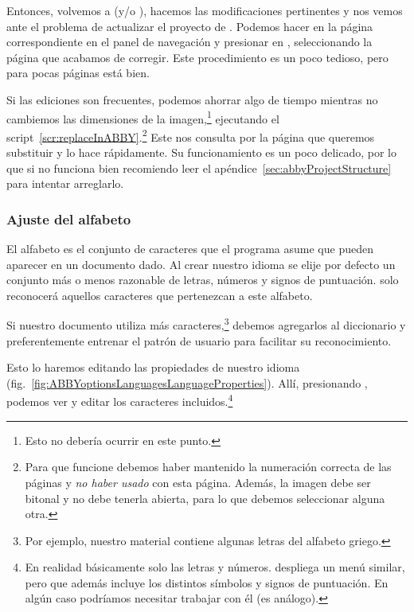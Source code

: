 \documentclass[%
	a5paper,
	10pt,
	twoside,
	openright,
	final,
]{memoir}
\begin{document}
	Entonces, volvemos a \scantailor (y/o \gimp), hacemos las modificaciones pertinentes y nos vemos ante el problema de actualizar el proyecto de \abby. Podemos hacer  en la página correspondiente en el panel de navegación y presionar en , seleccionando la página que acabamos de corregir. Este procedimiento es un poco tedioso, pero para pocas páginas está bien.

	Si las ediciones son frecuentes, podemos ahorrar algo de tiempo mientras no cambiemos las dimensiones de la imagen,\footnote{Esto no debería ocurrir en este punto.} ejecutando el script~\ref{scr:replaceInABBY}.\footnote{Para que funcione debemos haber mantenido la numeración correcta de las páginas y \emph{no haber usado}  con esta página. Además, la imagen debe ser bitonal y \abby no debe tenerla abierta, para lo que debemos seleccionar alguna otra.} Este nos consulta por la página que queremos substituir y lo hace rápidamente. Su funcionamiento es un poco delicado, por lo que si no funciona bien recomiendo leer el apéndice~\ref{sec:abbyProjectStructure} para intentar arreglarlo.


	\subsubsection{Ajuste del alfabeto} El alfabeto es el conjunto de caracteres que el programa asume que pueden aparecer en un documento dado. Al crear nuestro idioma se elije por defecto un conjunto más o menos razonable de letras, números y signos de puntuación. \abby solo reconocerá aquellos caracteres que pertenezcan a este alfabeto.

	Si nuestro documento utiliza más caracteres,\footnote{Por ejemplo, nuestro material contiene algunas letras del alfabeto griego.} debemos agregarlos al diccionario y preferentemente entrenar el patrón de usuario para facilitar su reconocimiento.

	Esto lo haremos editando las propiedades de nuestro idioma (fig.~\ref{fig:ABBYoptionsLanguagesLanguageProperties}). Allí, presionando \keys{\raisebox{.25em}{\...}}, podemos ver y editar los caracteres incluidos.\footnote{En realidad básicamente solo las letras y números.  despliega un menú similar, pero que además incluye los distintos símbolos y signos de puntuación. En algún caso podríamos necesitar trabajar con él (es análogo).}
\end{document}
